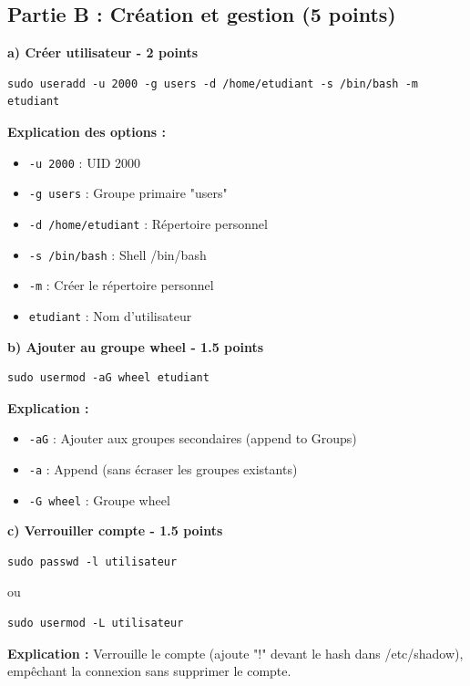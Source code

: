\documentclass[12pt,a4paper]{article}
\begin{document}
\subsection*{Partie B : Création et gestion (5 points)}

\begin{answerbox}
\textbf{a) Créer utilisateur - 2 points}

\begin{lstlisting}
sudo useradd -u 2000 -g users -d /home/etudiant -s /bin/bash -m etudiant
\end{lstlisting}

\textbf{Explication des options :}
\begin{itemize}
    \item \texttt{-u 2000} : UID 2000
    \item \texttt{-g users} : Groupe primaire "users"
    \item \texttt{-d /home/etudiant} : Répertoire personnel
    \item \texttt{-s /bin/bash} : Shell /bin/bash
    \item \texttt{-m} : Créer le répertoire personnel
    \item \texttt{etudiant} : Nom d'utilisateur
\end{itemize}

\textbf{b) Ajouter au groupe wheel - 1.5 points}

\begin{lstlisting}
sudo usermod -aG wheel etudiant
\end{lstlisting}

\textbf{Explication :}
\begin{itemize}
    \item \texttt{-aG} : Ajouter aux groupes secondaires (append to Groups)
    \item \texttt{-a} : Append (sans écraser les groupes existants)
    \item \texttt{-G wheel} : Groupe wheel
\end{itemize}

\textbf{c) Verrouiller compte - 1.5 points}

\begin{lstlisting}
sudo passwd -l utilisateur
\end{lstlisting}

ou

\begin{lstlisting}
sudo usermod -L utilisateur
\end{lstlisting}

\textbf{Explication :} Verrouille le compte (ajoute "!" devant le hash dans /etc/shadow), empêchant la connexion sans supprimer le compte.
\end{answerbox}
\end{document}
